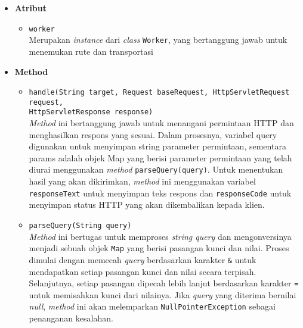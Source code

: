 \begin{itemize}
    \item \textbf{Atribut}
    \begin{itemize}
        \item \texttt{worker}
        \\ Merupakan \textit{instance} dari \textit{class} \texttt{Worker}, yang bertanggung jawab untuk menemukan rute dan transportasi 
    \end{itemize}
\newpage
    \item \textbf{Method}
    \begin{itemize}
        \item \texttt{handle(String target, Request baseRequest, HttpServletRequest request,\\ HttpServletResponse response)}
        \\ \textit{Method} ini bertanggung jawab untuk menangani permintaan HTTP dan menghasilkan respons yang sesuai. Dalam prosesnya, variabel query digunakan untuk menyimpan string parameter permintaan, sementara params adalah objek Map yang berisi parameter permintaan yang telah diurai menggunakan \textit{method} \texttt{parseQuery(query)}. Untuk menentukan hasil yang akan dikirimkan, \textit{method} ini menggunakan variabel \texttt{responseText} untuk menyimpan teks respons dan \texttt{responseCode} untuk menyimpan status HTTP yang akan dikembalikan kepada klien.
        \item \texttt{parseQuery(String query)}
        \\ \textit{Method} ini bertugas untuk memproses \textit{string query} dan mengonversinya menjadi sebuah objek \texttt{Map} yang berisi pasangan kunci dan nilai. Proses dimulai dengan memecah \textit{query} berdasarkan karakter \texttt{\&} untuk mendapatkan setiap pasangan kunci dan nilai secara terpisah. Selanjutnya, setiap pasangan dipecah lebih lanjut berdasarkan karakter \texttt{=} untuk memisahkan kunci dari nilainya. Jika \textit{query} yang diterima bernilai \textit{null}, \textit{method} ini akan melemparkan \texttt{NullPointerException} sebagai penanganan kesalahan. 
    \end{itemize}
\end{itemize}

